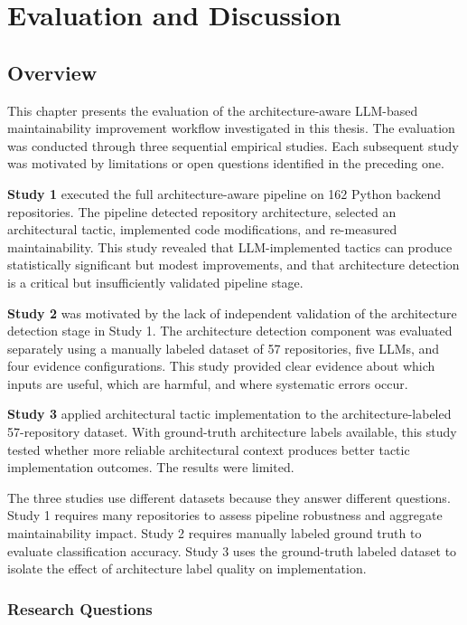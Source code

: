 \chapter{Evaluation and Discussion}
\label{chap:eval}

\section{Overview}
\label{sec:eval_overview}

This chapter presents the evaluation of the architecture-aware LLM-based maintainability improvement workflow investigated in this thesis. The evaluation was conducted through three sequential empirical studies. Each subsequent study was motivated by limitations or open questions identified in the preceding one.

\textbf{Study 1} executed the full architecture-aware pipeline on 162 Python backend repositories. The pipeline detected repository architecture, selected an architectural tactic, implemented code modifications, and re-measured maintainability. This study revealed that LLM-implemented tactics can produce statistically significant but modest improvements, and that architecture detection is a critical but insufficiently validated pipeline stage.

\textbf{Study 2} was motivated by the lack of independent validation of the architecture detection stage in Study 1. The architecture detection component was evaluated separately using a manually labeled dataset of 57 repositories, five LLMs, and four evidence configurations. This study provided clear evidence about which inputs are useful, which are harmful, and where systematic errors occur.

\textbf{Study 3} applied architectural tactic implementation to the architecture-labeled 57-repository dataset. With ground-truth architecture labels available, this study tested whether more reliable architectural context produces better tactic implementation outcomes. The results were limited.

The three studies use different datasets because they answer different questions. Study 1 requires many repositories to assess pipeline robustness and aggregate maintainability impact. Study 2 requires manually labeled ground truth to evaluate classification accuracy. Study 3 uses the ground-truth labeled dataset to isolate the effect of architecture label quality on implementation.

\subsection{Research Questions}
\label{sec:eval_rq}

